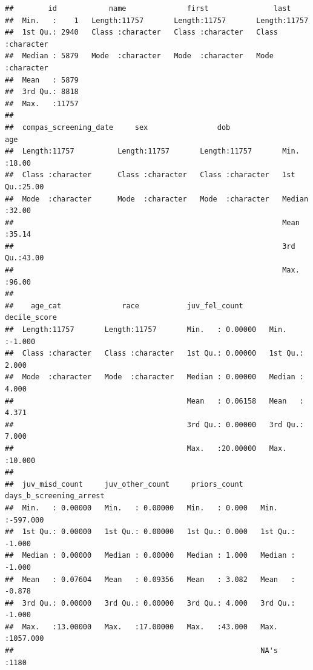 \documentclass[
]{article}
\begin{document}
\begin{verbatim}
##        id            name              first               last          
##  Min.   :    1   Length:11757       Length:11757       Length:11757      
##  1st Qu.: 2940   Class :character   Class :character   Class :character  
##  Median : 5879   Mode  :character   Mode  :character   Mode  :character  
##  Mean   : 5879                                                           
##  3rd Qu.: 8818                                                           
##  Max.   :11757                                                           
##                                                                          
##  compas_screening_date     sex                dob                 age       
##  Length:11757          Length:11757       Length:11757       Min.   :18.00  
##  Class :character      Class :character   Class :character   1st Qu.:25.00  
##  Mode  :character      Mode  :character   Mode  :character   Median :32.00  
##                                                              Mean   :35.14  
##                                                              3rd Qu.:43.00  
##                                                              Max.   :96.00  
##                                                                             
##    age_cat              race           juv_fel_count       decile_score   
##  Length:11757       Length:11757       Min.   : 0.00000   Min.   :-1.000  
##  Class :character   Class :character   1st Qu.: 0.00000   1st Qu.: 2.000  
##  Mode  :character   Mode  :character   Median : 0.00000   Median : 4.000  
##                                        Mean   : 0.06158   Mean   : 4.371  
##                                        3rd Qu.: 0.00000   3rd Qu.: 7.000  
##                                        Max.   :20.00000   Max.   :10.000  
##                                                                           
##  juv_misd_count     juv_other_count     priors_count    days_b_screening_arrest
##  Min.   : 0.00000   Min.   : 0.00000   Min.   : 0.000   Min.   :-597.000       
##  1st Qu.: 0.00000   1st Qu.: 0.00000   1st Qu.: 0.000   1st Qu.:  -1.000       
##  Median : 0.00000   Median : 0.00000   Median : 1.000   Median :  -1.000       
##  Mean   : 0.07604   Mean   : 0.09356   Mean   : 3.082   Mean   :  -0.878       
##  3rd Qu.: 0.00000   3rd Qu.: 0.00000   3rd Qu.: 4.000   3rd Qu.:  -1.000       
##  Max.   :13.00000   Max.   :17.00000   Max.   :43.000   Max.   :1057.000       
##                                                         NA's   :1180           

\end{verbatim}
\end{document}
